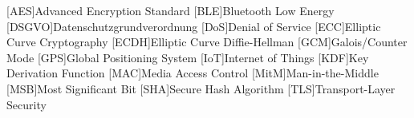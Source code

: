 \begin{acronym}[AAAAA]

    [AES]{Advanced Encryption Standard}
    [BLE]{Bluetooth Low Energy}
    [DSGVO]{Datenschutzgrundverordnung}
    [DoS]{Denial of Service}
    [ECC]{Elliptic Curve Cryptography}
    [ECDH]{Elliptic Curve Diffie-Hellman}
    [GCM]{Galois/Counter Mode}
    [GPS]{Global Positioning System}
    [IoT]{Internet of Things}
    [KDF]{Key Derivation Function}
    [MAC]{Media Access Control}
    [MitM]{Man-in-the-Middle}
    [MSB]{Most Significant Bit}
    [SHA]{Secure Hash Algorithm}
    [TLS]{Transport-Layer Security}
    
\end{acronym}